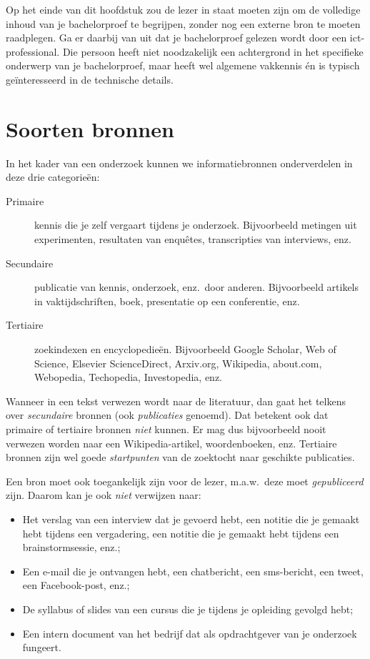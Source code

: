 Op het einde van dit hoofdstuk zou de lezer in staat moeten zijn om de volledige inhoud van je bachelorproef te begrijpen, zonder nog een externe bron te moeten raadplegen. Ga er daarbij van uit dat je bachelorproef gelezen wordt door een ict-professional. Die persoon heeft niet noodzakelijk een achtergrond in het specifieke onderwerp van je bachelorproef, maar heeft wel algemene vakkennis én is typisch geïnteresseerd in de technische details.

\section{Soorten bronnen}%
\label{sec:soorten-bronnen}

In het kader van een onderzoek kunnen we informatiebronnen onderverdelen in deze drie categorieën:

\begin{description}
  \item[Primaire] kennis die je zelf vergaart tijdens je onderzoek. Bijvoorbeeld metingen uit experimenten, resultaten van enquêtes, transcripties van interviews, enz.
  \item[Secundaire] publicatie van kennis, onderzoek, enz.~door anderen. Bijvoorbeeld artikels in vaktijdschriften, boek, presentatie op een conferentie, enz.
  \item[Tertiaire] zoekindexen en encyclopedieën. Bijvoorbeeld Google Scholar, Web of Science, Elsevier ScienceDirect, Arxiv.org, Wikipedia, about.com, Webopedia, Techopedia, Investopedia, enz.
\end{description}

Wanneer in een tekst verwezen wordt naar de literatuur, dan gaat het telkens over \emph{secundaire} bronnen (ook \emph{publicaties} genoemd). Dat betekent ook dat primaire of tertiaire bronnen \emph{niet} kunnen. Er mag dus bijvoorbeeld nooit verwezen worden naar een Wikipedia-artikel, woordenboeken, enz. Tertiaire bronnen zijn wel goede \textit{startpunten} van de zoektocht naar geschikte publicaties.

Een bron moet ook toegankelijk zijn voor de lezer, m.a.w.\ deze moet \textit{gepubliceerd} zijn. Daarom kan je ook \textit{niet} verwijzen naar:

\begin{itemize}
  \item Het verslag van een interview dat je gevoerd hebt, een notitie die je gemaakt hebt tijdens een vergadering, een notitie die je gemaakt hebt tijdens een brainstormsessie, enz.;
  \item Een e-mail die je ontvangen hebt, een chatbericht, een sms-bericht, een tweet, een Facebook-post, enz.;
  \item De syllabus of slides van een cursus die je tijdens je opleiding gevolgd hebt;
  \item Een intern document van het bedrijf dat als opdrachtgever van je onderzoek fungeert.
\end{itemize}


